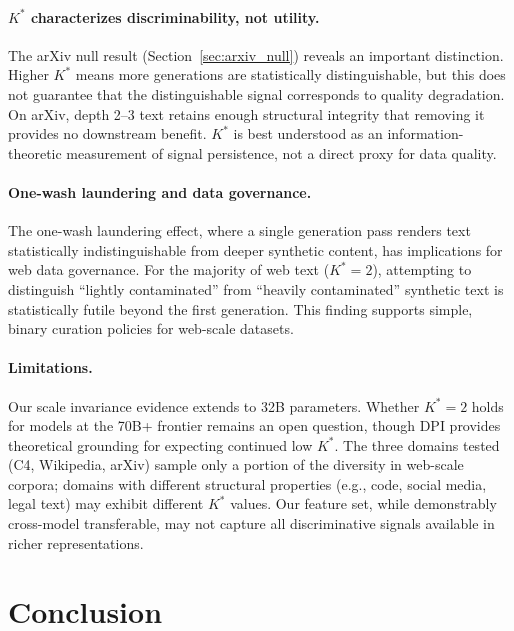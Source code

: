 \documentclass[11pt,a4paper]{article}
\begin{document}
\paragraph{$K^*$ characterizes discriminability, not utility.}
The arXiv null result (Section~\ref{sec:arxiv_null}) reveals an important distinction. Higher $K^*$ means more generations are statistically distinguishable, but this does not guarantee that the distinguishable signal corresponds to quality degradation. On arXiv, depth 2--3 text retains enough structural integrity that removing it provides no downstream benefit. $K^*$ is best understood as an information-theoretic measurement of signal persistence, not a direct proxy for data quality.

\paragraph{One-wash laundering and data governance.}
The one-wash laundering effect, where a single generation pass renders text statistically indistinguishable from deeper synthetic content, has implications for web data governance. For the majority of web text ($K^*\!=\!2$), attempting to distinguish ``lightly contaminated'' from ``heavily contaminated'' synthetic text is statistically futile beyond the first generation. This finding supports simple, binary curation policies for web-scale datasets.

\paragraph{Limitations.}
Our scale invariance evidence extends to 32B parameters. Whether $K^*\!=\!2$ holds for models at the 70B+ frontier remains an open question, though DPI provides theoretical grounding for expecting continued low $K^*$. The three domains tested (C4, Wikipedia, arXiv) sample only a portion of the diversity in web-scale corpora; domains with different structural properties (e.g., code, social media, legal text) may exhibit different $K^*$ values. Our feature set, while demonstrably cross-model transferable, may not capture all discriminative signals available in richer representations.


\section{Conclusion}
\end{document}
